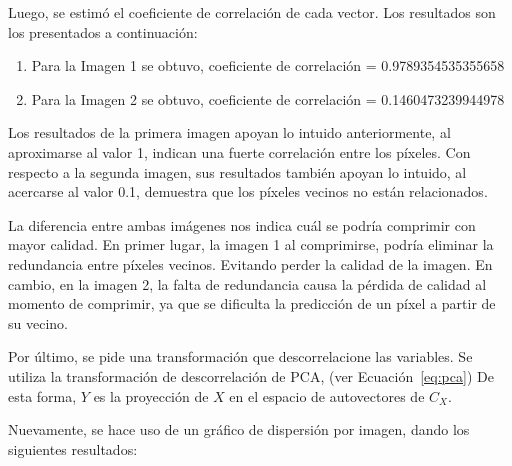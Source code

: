 \documentclass[a4paper,12pt]{article}
\begin{document}
Luego, se estimó el coeficiente de correlación de cada vector. Los resultados son los presentados a continuación:
\begin{enumerate}
    \item Para la Imagen 1 se obtuvo, 
    coeficiente de correlación = 0.9789354535355658

    \item Para la Imagen 2 se obtuvo, 
    coeficiente de correlación = 0.1460473239944978
\end{enumerate}

Los resultados de la primera imagen apoyan lo intuido anteriormente, al aproximarse al valor 1, indican una fuerte correlación entre los píxeles.
Con respecto a la segunda imagen, sus resultados también apoyan lo intuido, al acercarse al valor 0.1, demuestra que los píxeles vecinos no están relacionados.

\vspace{1em}

La diferencia entre ambas imágenes nos indica cuál se podría comprimir con mayor calidad. En primer lugar, la imagen 1 al comprimirse, podría eliminar la redundancia entre píxeles vecinos.
Evitando perder la calidad de la imagen. En cambio, en la imagen 2, la falta de redundancia causa la pérdida de calidad al momento de comprimir, ya que se dificulta la predicción de un píxel a partir de su vecino. 

\vspace{1em}

Por último, se pide una transformación que descorrelacione las variables.
Se utiliza la transformación de descorrelación de PCA, (ver Ecuación~\ref{eq:pca})
De esta forma, \(Y\) es la proyección de \(X\) en el espacio de autovectores de \(C_X\).

Nuevamente, se hace uso de un gráfico de dispersión por imagen, dando los siguientes resultados:
\end{document}
